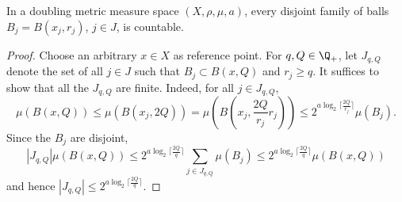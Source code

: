 \begin{lemma}
    \leanok
    \label{disjoint-family-countable}
    In a doubling metric measure space $(X,\rho,\mu, a)$, every disjoint family of balls $B_j = B(x_j, r_j)$, $j\in J$, is countable.
\end{lemma}
\begin{proof}
    \leanok
    Choose an arbitrary $x\in X$ as reference point. For $q, Q\in\Q_+$, let $J_{q,Q}$ denote the set of all $j\in J$ such that $B_j\subset B(x, Q)$ and $r_j \ge q$. It suffices to show that all the $J_{q,Q}$ are finite.
    Indeed, for all $j\in J_{q,Q}$,
    \begin{equation*}
        \mu(B(x, Q)) \le \mu(B(x_j, 2Q)) = \mu(B(x_j, \frac{2 Q}{r_j} r_j))
        \le 2^{a\log_2{\lceil \frac{2 Q}{r_j}\rceil}} \mu(B_j).
    \end{equation*}
    Since the $B_j$ are disjoint,
    \begin{equation}
        |J_{q,Q}| \mu(B(x, Q)) \le 2^{a\log_2{\lceil\frac{2Q}{q}\rceil}} \sum_{j\in J_{q,Q}} \mu(B_j) \le 2^{a\log_2{\lceil\frac{2Q}{q}\rceil}} \mu(B(x,Q))
    \end{equation}
    and hence $|J_{q,Q}| \le 2^{a\log_2{\lceil\frac{2Q}{q}\rceil}}$.
\end{proof}

